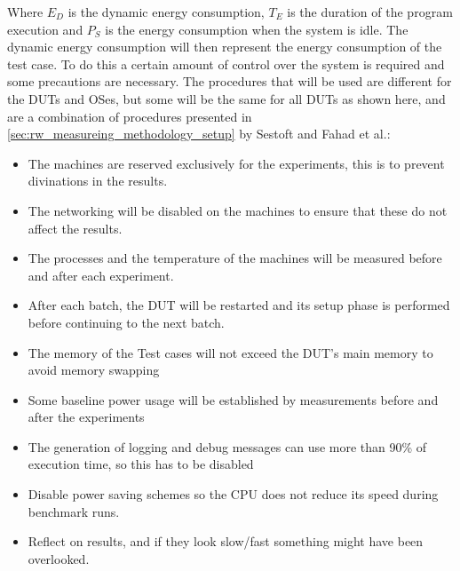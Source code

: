 Where $E_D$ is the dynamic energy consumption, $T_E$ is the duration of the program execution and $P_S$ is the energy consumption when the system is idle. The dynamic energy consumption will then represent the energy consumption of the test case. To do this a certain amount of control over the system is required and some precautions are necessary. The procedures that will be used are different for the DUTs and OSes, but some will be the same for all DUTs as shown here, and are a combination of procedures presented in \cref*{sec:rw_measureing_methodology_setup} by Sestoft\cite*[]{sestoft2013microbenchmarks} and Fahad et al.\cite*[]{fahad2019comparative}:

\begin{itemize}
    \item The machines are reserved exclusively for the experiments, this is to prevent divinations in the results.
    \item The networking will be disabled on the machines to ensure that these do not affect the results.
    \item The processes and the temperature of the machines will be measured before and after each experiment.
    \item After each batch, the DUT will be restarted and its setup phase is performed before continuing to the next batch.
    \item The memory of the Test cases will not exceed the DUT's main memory to avoid memory swapping
    \item Some baseline power usage will be established by measurements before and after the experiments
    \item The generation of logging and debug messages can use more than 90\% of execution time, so this has to be disabled
    \item Disable power saving schemes so the CPU does not reduce its speed during benchmark runs.
    \item Reflect on results, and if they look slow/fast something might have been overlooked.
\end{itemize}

